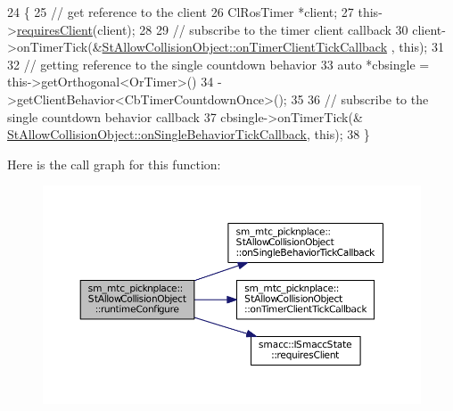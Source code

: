 \begin{DoxyCode}
24     \{
25         \textcolor{comment}{// get reference to the client}
26         ClRosTimer *client;
27         this->\hyperlink{classsmacc_1_1ISmaccState_a7f95c9f0a6ea2d6f18d1aec0519de4ac}{requiresClient}(client);
28 
29         \textcolor{comment}{// subscribe to the timer client callback}
30         client->onTimerTick(&\hyperlink{structsm__mtc__picknplace_1_1StAllowCollisionObject_a420046271076ba5c767fe9c36826a92d}{StAllowCollisionObject::onTimerClientTickCallback}
      , \textcolor{keyword}{this});
31 
32         \textcolor{comment}{// getting reference to the single countdown behavior}
33         \textcolor{keyword}{auto} *cbsingle = this->getOrthogonal<OrTimer>()
34                              ->getClientBehavior<CbTimerCountdownOnce>();
35 
36         \textcolor{comment}{// subscribe to the single countdown behavior callback}
37         cbsingle->onTimerTick(&
      \hyperlink{structsm__mtc__picknplace_1_1StAllowCollisionObject_a215f56fe5183209cbacb1a99b8624341}{StAllowCollisionObject::onSingleBehaviorTickCallback}, \textcolor{keyword}{
      this});
38     \}
\end{DoxyCode}


Here is the call graph for this function\+:
\nopagebreak
\begin{figure}[H]
\begin{center}
\leavevmode
\includegraphics[width=350pt]{structsm__mtc__picknplace_1_1StAllowCollisionObject_aef20da394e1e4bb53b918e9e8c8eabef_cgraph}
\end{center}
\end{figure}


